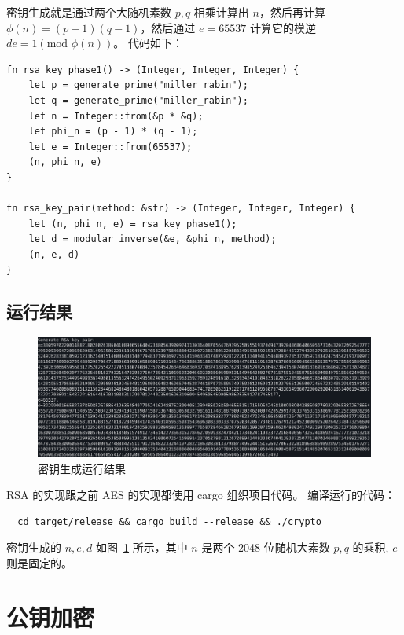 \documentclass[degree=project,degree-type=project,cjk-font=noto]{thuthesis}
\begin{document}
密钥生成就是通过两个大随机素数 $p,q$ 相乘计算出 $n$，然后再计算 $\phi(n) = (p-1)(q-1)$，然后通过 $e = 65537$ 计算它的模逆 $de = 1 (\text{mod } \phi(n))$。
代码如下：

  \begin{verbatim}
fn rsa_key_phase1() -> (Integer, Integer, Integer) {
    let p = generate_prime("miller_rabin");
    let q = generate_prime("miller_rabin");
    let n = Integer::from(&p * &q);
    let phi_n = (p - 1) * (q - 1);
    let e = Integer::from(65537);
    (n, phi_n, e)
}

fn rsa_key_pair(method: &str) -> (Integer, Integer, Integer) {
    let (n, phi_n, e) = rsa_key_phase1();
    let d = modular_inverse(&e, &phi_n, method);
    (n, e, d)
}
\end{verbatim}

\subsection{运行结果}

\begin{figure}[h]
\centering%
\includegraphics[width=\linewidth]{rsa_t1.png}
  \caption{密钥生成运行结果}
  \label{fig:t1}
\end{figure}

RSA 的实现跟之前 AES 的实现都使用 cargo 组织项目代码。
编译运行的代码：

  \begin{verbatim}
  cd target/release && cargo build --release && ./crypto
  \end{verbatim}

密钥生成的 $n, e, d$ 如图~\ref{fig:t1} 所示，其中 $n$ 是两个 2048 位随机大素数 $p, q$ 的乘积, $e$ 则是固定的。

\section{公钥加密}
\end{document}
